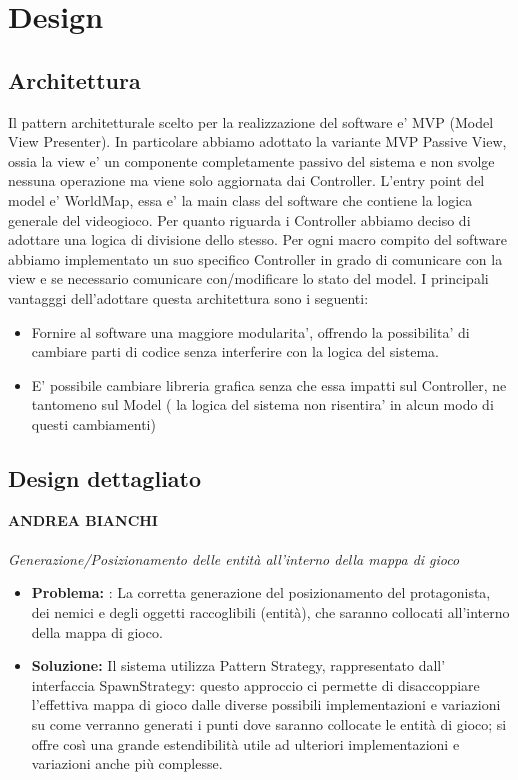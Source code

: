 \documentclass[a4paper,12pt]{report}
\begin{document}
\chapter{Design}

\section{Architettura}
Il pattern architetturale scelto per la realizzazione del software e' MVP (Model View Presenter). In particolare abbiamo adottato la variante MVP Passive View, ossia la view e' un componente completamente passivo del sistema e non svolge nessuna operazione ma viene solo aggiornata dai Controller.
L'entry point del model e' WorldMap, essa e' la main class del software che contiene la logica generale del videogioco. Per quanto riguarda i Controller abbiamo deciso di adottare una logica di divisione dello stesso. Per ogni macro compito del software abbiamo implementato un suo specifico Controller in grado di comunicare con la view e se necessario comunicare con/modificare lo stato del model.
I principali vantagggi dell'adottare questa architettura sono i seguenti:
\begin{itemize}
	\item Fornire al software una maggiore modularita', offrendo la possibilita' di cambiare parti di codice senza interferire con la logica del sistema. 
    \item E' possibile cambiare libreria grafica senza che essa impatti sul Controller, ne tantomeno sul Model ( la logica del sistema non risentira' in alcun modo di questi cambiamenti) 
\end{itemize}

\section{Design dettagliato}
\textbf{ANDREA BIANCHI}
\\ \\
\textit{Generazione/Posizionamento delle entità all’interno della mappa di gioco}
\begin{itemize}
    \item \textbf{Problema:} : La corretta generazione del posizionamento del protagonista, dei nemici e degli oggetti raccoglibili (entità), che saranno collocati all’interno della mappa di gioco.
    \item \textbf{Soluzione:} Il sistema utilizza Pattern Strategy, rappresentato dall’ interfaccia SpawnStrategy: questo approccio ci permette di disaccoppiare l’effettiva mappa di gioco dalle diverse  possibili implementazioni e variazioni su come verranno generati i punti dove saranno collocate le entità di gioco; si offre così una grande estendibilità utile ad ulteriori implementazioni e variazioni anche più complesse.
\end{itemize}
\end{document}

